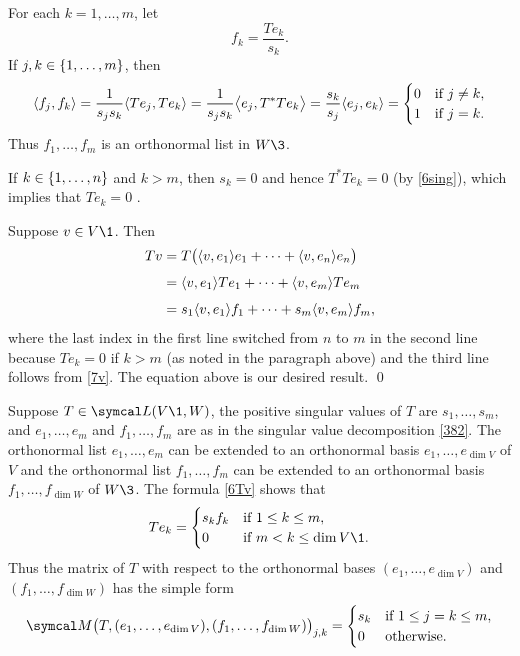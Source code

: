For each $k = 1, \ldots, m$, let
\begin{equation} \label{7v}
f_k = \frac{Te_k}{s_k}.
\end{equation}%
If $j, k \in \br{1, \ldots, m}$, then
\[
\ip{f_j, f_k} = \frac{1}{s_j s_k} \ip{Te_j, Te_k} =  \frac{1}{s_j s_k} \ip[\big]{e_j, T^*T e_k} = \frac{s_k}{s_j} \ip{e_j, e_k}
= \begin{cases}
0 & \text{if } j \ne k ,\\
1 & \text{if } j = k.
\end{cases}
\]
Thus $f_1, \ldots, f_m$ is an orthonormal list in $W\3$.

If $k \in \br{1, \ldots, n}$ and $k > m$, then $s_k = 0$ and hence $T^*T e_k = 0$ (by \ref{6sing}), which implies that $Te_k = 0$
.

Suppose $v \in V\1$. Then
\begin{align*}
Tv &= T\paren[\big]{ \ip{v, e_1} e_1 + \cdots + \ip{v, e_n} e_n } \\[4bp]
&= \ip{v, e_1} Te_1 + \cdots + \ip{v, e_m} Te_m \\[4bp]
&= s_1 \ip{v, e_1} f_1 + \cdots + s_m \ip{v, e_m} f_m,
\end{align*}
where the last index in the first line switched from $n$ to $m$ in the second line because $Te_k = 0$ if $k > m$ (as noted in the paragraph above) and the third line follows from \ref{7v}. The equation above is our desired result.
\qed

\pagebreak[3]

Suppose $T \in \L(V\1, W)$, the positive singular values of $T$ are $s_1, \ldots, s_m$, and $e_1, \ldots, e_m$ and $f_1, \ldots, f_m$ are as in the singular value decomposition \ref{382}. The orthonormal list $e_1, \ldots, e_m$ can be extended to an orthonormal basis
$e_1, \ldots, e_{\dim V}$ of $V$ and the orthonormal list $f_1, \ldots, f_m$ can be extended to an orthonormal basis
$f_1, \ldots, f_{\dim W}$ of $W\3$. The formula \ref{6Tv} shows that
\[
Te_k = \begin{cases}
s_k f_k & \text{if } 1 \le k \le m,\\
0 & \text{if } m < k \le \dim V\1.
\end{cases}
\]
Thus the matrix of $T$ with respect to the orthonormal bases $(e_1, \ldots, e_{\dim V})$ and $(f_1, \ldots, f_{\dim W})$ has the simple form
\[
\M\paren[\big]{ T, (e_1, \ldots, e_{\dim V}), (f_1, \ldots, f_{\dim W}) }_{j,k} =
\begin{cases}
s_k &\text{if } 1 \le j = k \le m, \\
0 &\text{otherwise}.
\end{cases}
\]

